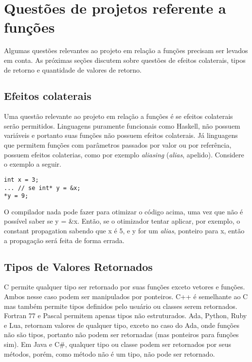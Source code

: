 \section{Questões de projetos referente a funções} 
\label{sec:questoes_de_projetos_referentes_a_funcoes}
Algumas questões relevantes ao projeto em relação a funções precisam ser levados em conta. As próximas seções discutem sobre questões de efeitos colaterais, tipos de retorno e quantidade de valores de retorno.

\subsection{Efeitos colaterais}
\label{sub:efeitos_colaterais}
Uma questão relevante ao projeto em relação a funções é se efeitos colaterais serão permitidos. Linguagens puramente funcionais como Haskell, não possuem variáveis e portanto suas funções não possuem efeitos colaterais. Já linguagens que permitem funções com parâmetros passados por valor ou por referência, possuem efeitos colaterias, como por exemplo \textit{aliasing} (\textit{alias}, apelido). Considere o exemplo a seguir.

\begin{verbatim}
int x = 3; 
... // se int* y = &x;
*y = 9;
\end{verbatim}

O compilador nada pode fazer para otimizar o código acima, uma vez que não é possível saber se y = \&x. Então, se o otimizador tentar aplicar, por exemplo, o constant propagation sabendo que x é 5, e y for um \textit{alias}, ponteiro para x, então a propagação será feita de forma errada. 

\subsection{Tipos de Valores Retornados}
\label{sub:tipos_de_valores_retornados}
C permite qualquer tipo ser retornado por suas funções exceto vetores e funções. Ambos nesse caso podem ser manipulados por ponteiros. C++ é semelhante ao C mas também permite tipos definidos pelo usuário ou classes serem retornados. Fortran 77 e Pascal permitem apenas tipos não estruturados. Ada, Python, Ruby e Lua, retornam valores de qualquer tipo, exceto no caso do Ada, onde funções não são tipos, portanto não podem ser retornadas (mas ponteiros para funções sim). Em Java e C\#, qualquer tipo ou classe podem ser retornados por seus métodos, porém, como método não é um tipo, não pode ser retornado.

